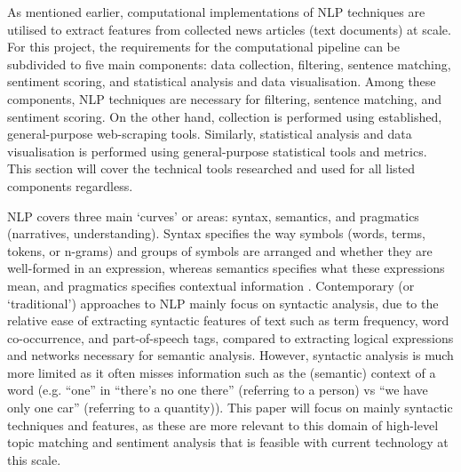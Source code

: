 \documentclass{report}
\begin{document}
As mentioned earlier, computational implementations of NLP techniques are utilised to extract features from collected news articles (text documents) at scale.
For this project, the requirements for the computational pipeline can be subdivided to five main components: data collection, filtering, sentence matching, sentiment scoring, and statistical analysis and data visualisation.
Among these components, NLP techniques are necessary for filtering, sentence matching, and sentiment scoring.
On the other hand, collection is performed using established, general-purpose web-scraping tools.
Similarly, statistical analysis and data visualisation is performed using general-purpose statistical tools and metrics.
This section will cover the technical tools researched and used for all listed components regardless.

NLP covers three main `curves' or areas:  syntax, semantics, and pragmatics (narratives, understanding). 
Syntax specifies the way symbols (words, terms, tokens, or n-grams) and groups of symbols are arranged and whether they are well-formed in an expression, whereas semantics specifies what these expressions mean, and pragmatics specifies contextual information \cite{cambria2014jumping}.
Contemporary (or `traditional') approaches to NLP mainly focus on syntactic analysis, due to the relative ease of extracting syntactic features of text such as term frequency, word co-occurrence, and part-of-speech tags, compared to extracting logical expressions and networks necessary for semantic analysis.
However, syntactic analysis is much more limited as it often misses information such as the (semantic) context of a word (e.g. ``one'' in ``there's no one there'' (referring to a person) vs ``we have only one car'' (referring to a quantity)).
This paper will focus on mainly syntactic techniques and features, as these are more relevant to this domain of high-level topic matching and sentiment analysis that is feasible with current technology at this scale.
\end{document}
